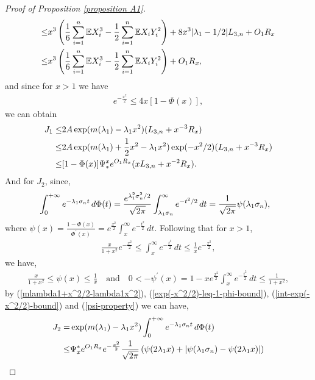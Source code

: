 \documentclass[bj,authoryear]{imsart}
\numberwithin{equation}{section}
\theoremstyle{plain}
\theoremstyle{definition}
\begin{document}
\begin{proof}[Proof of Proposition \ref{proposition A1}]
\begin{align}
  \leq & x^3\left(\frac{1}{6}\sum_{i = 1}^{n}\mathbb{E}X_{i}^{3}-\frac{1}{2}\sum_{i = 1}^{n}\mathbb{E}X_{i}Y_{i}^{2}\right)+ 8x^3|\lambda_{1}-1/2|L_{3,n}+O_1R_{x}\notag\\
  \leq & x^3\left(\frac{1}{6}\sum_{i = 1}^{n}\mathbb{E}X_{i}^{3}-\frac{1}{2}\sum_{i = 1}^{n}\mathbb{E}X_{i}Y_{i}^{2}\right)+O_1R_{x},\label{mlambda1+x^2/2-lambda1x^2}
\end{align}
and since for $x>1$ we have
\begin{align}
  e^{-\frac{x^2}{2}} \leq 4x[1-\Phi(x)],\label{exp(-x^2/2)-leq-1-phi-bound}
\end{align}
we can obtain
\begin{align}
  J_{1} \leq &  2A\exp(m(\lambda_1)-\lambda_1x^2)(L_{3,n}+x^{-3}R_x)\notag\\
  \leq & 2A\exp(m(\lambda_1) +\frac{1}{2}x^2-\lambda_1x^2)\exp(-x^2/2)(L_{3,n}+x^{-3}R_x)\notag\\
  \leq &[1-\Phi(x)]\Psi_{*}^{x}e^{O_{1}R_{x}}(xL_{3,n}+x^{-2}R_{x}).\label{J-1-bound-final}
\end{align}
And for $J_{2}$, since,
\begin{align}
  &\int_{0}^{+\infty}e^{-\lambda_{1}\sigma_nt}\,d\Phi(t) =  \frac{e^{\lambda_{1}^{2}\sigma_{n}^{2}/2}}{\sqrt{2\pi}}\int_{\lambda_{1}\sigma_{n}}^{\infty}e^{-t^2/2}\,dt =\frac{1}{\sqrt{2\pi}}\psi(\lambda_{1}\sigma_{n}),\notag
\end{align}
where $\psi(x) = \frac{1-\Phi(x)}{\Phi^{'}(x)} = e^{\frac{x^2}{2}}\int_{x}^{\infty}e^{-\frac{t^2}{2}}\,dt$. Following that for $x>1$,%
\begin{align}
  \frac{x}{1+x^2}e^{-\frac{x^2}{2}}\leq \int_{x}^{\infty}e^{-\frac{t^2}{2}}\,dt\leq \frac{1}{x}e^{-\frac{x^2}{2}},\label{int-exp(-x^2/2)-bound}
\end{align}
we have,
\begin{align}
  \frac{x}{1+x^2} \leq \psi(x) \leq  \frac{1}{x} \quad \text{and} \quad 0<-\psi^{\prime}(x) = 1-xe^{\frac{x^2}{2}}\int_{x}^{\infty}e^{-\frac{t^2}{2}}\,dt\leq \frac{1}{1+x^2},\label{psi-property}
\end{align}
by (\ref{mlambda1+x^2/2-lambda1x^2}), (\ref{exp(-x^2/2)-leq-1-phi-bound}), (\ref{int-exp(-x^2/2)-bound}) and (\ref{psi-property}) we can have,
\begin{align}
  J_2 = & \exp(m(\lambda_1)-\lambda_1x^2)\int_{0}^{+\infty}e^{-\lambda_{1}\sigma_{n}t}\,d\Phi(t)\notag\\
  \leq &\Psi^{*}_{x}e^{O_{1}R_x}e^{-\frac{x^2}{2}}\frac{1}{\sqrt{2\pi}}\left(\psi(2\lambda_{1}x)+|\psi(\lambda_{1}\sigma_n)-\psi(2\lambda_{1}x)|\right)\notag\\

\end{align}
\end{proof}
\end{document}
